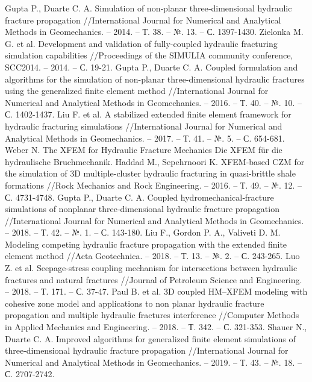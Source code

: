\begin{thebibliography}{3}
Gupta P., Duarte C. A. Simulation of non‐planar three‐dimensional hydraulic fracture propagation //International Journal for Numerical and Analytical Methods in Geomechanics. – 2014. – Т. 38. – №. 13. – С. 1397-1430.
Zielonka M. G. et al. Development and validation of fully-coupled hydraulic fracturing simulation capabilities //Proceedings of the SIMULIA community conference, SCC2014. – 2014. – С. 19-21.
Gupta P., Duarte C. A. Coupled formulation and algorithms for the simulation of non-planar three-dimensional hydraulic fractures using the generalized finite element method //International Journal for Numerical and Analytical Methods in Geomechanics. – 2016. – Т. 40. – №. 10. – С. 1402-1437.
Liu F. et al. A stabilized extended finite element framework for hydraulic fracturing simulations //International Journal for Numerical and Analytical Methods in Geomechanics. – 2017. – Т. 41. – №. 5. – С. 654-681.
Weber N. The XFEM for Hydraulic Fracture Mechanics Die XFEM für die hydraulische Bruchmechanik.
Haddad M., Sepehrnoori K. XFEM-based CZM for the simulation of 3D multiple-cluster hydraulic fracturing in quasi-brittle shale formations //Rock Mechanics and Rock Engineering. – 2016. – Т. 49. – №. 12. – С. 4731-4748.
Gupta P., Duarte C. A. Coupled hydromechanical‐fracture simulations of nonplanar three‐dimensional hydraulic fracture propagation //International Journal for Numerical and Analytical Methods in Geomechanics. – 2018. – Т. 42. – №. 1. – С. 143-180.
Liu F., Gordon P. A., Valiveti D. M. Modeling competing hydraulic fracture propagation with the extended finite element method //Acta Geotechnica. – 2018. – Т. 13. – №. 2. – С. 243-265.
Luo Z. et al. Seepage-stress coupling mechanism for intersections between hydraulic fractures and natural fractures //Journal of Petroleum Science and Engineering. – 2018. – Т. 171. – С. 37-47.
Paul B. et al. 3D coupled HM–XFEM modeling with cohesive zone model and applications to non planar hydraulic fracture propagation and multiple hydraulic fractures interference //Computer Methods in Applied Mechanics and Engineering. – 2018. – Т. 342. – С. 321-353.
Shauer N., Duarte C. A. Improved algorithms for generalized finite element simulations of three‐dimensional hydraulic fracture propagation //International Journal for Numerical and Analytical Methods in Geomechanics. – 2019. – Т. 43. – №. 18. – С. 2707-2742.

\end{thebibliography}
